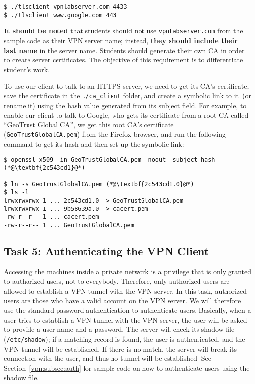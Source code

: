 \begin{lstlisting}
$ ./tlsclient vpnlabserver.com 4433
$ ./tlsclient www.google.com 443
\end{lstlisting}


\textbf{It should be noted} that students should not use 
\texttt{vpnlabserver.com} from the sample code as their VPN server name;
instead, \textbf{they should include their last name} in the server 
name. Students should generate their own CA in order to create 
server certificates. The objective of this requirement is to differentiate
student's work.


To use our client to talk to an HTTPS server, we need to get its CA's certificate, 
save the certificate in the \texttt{./ca\_client} folder, and create a symbolic link to it~(or
rename it) using the hash value generated from its subject field.
For example, to enable our client to talk to Google, who gets 
its certificate from a root CA called ``GeoTrust Global CA'', we
get this root CA's certificate (\texttt{GeoTrustGlobalCA.pem})  
from the Firefox browser,
and run the following command to get its hash and then set up the symbolic link:

\begin{lstlisting}
$ openssl x509 -in GeoTrustGlobalCA.pem -noout -subject_hash
(*@\textbf{2c543cd1}@*)

$ ln -s GeoTrustGlobalCA.pem (*@\textbf{2c543cd1.0}@*)
$ ls -l
lrwxrwxrwx 1 ... 2c543cd1.0 -> GeoTrustGlobalCA.pem
lrwxrwxrwx 1 ... 9b58639a.0 -> cacert.pem
-rw-r--r-- 1 ... cacert.pem
-rw-r--r-- 1 ... GeoTrustGlobalCA.pem
\end{lstlisting}






\subsection{Task 5: Authenticating the VPN Client}

Accessing the machines inside a private network is a privilege that is only
granted to authorized users, not to everybody. Therefore, only authorized
users are allowed to establish a VPN tunnel with the VPN server. 
In this task, authorized users are those who have a valid account on the VPN server.
We will therefore use the standard password authentication to authenticate
users. Basically, when a user tries to establish a VPN tunnel 
with the VPN server, the user will be asked to provide a user name and a
password. The server will check its shadow file (\texttt{/etc/shadow}); 
if a matching record is found, the user is authenticated, and the 
VPN tunnel will be established. If there is no match, the server will
break its connection with the user, and thus no tunnel will be established. 
See Section~\ref{vpn:subsec:auth} for 
sample code on how to authenticate users using the shadow file.


